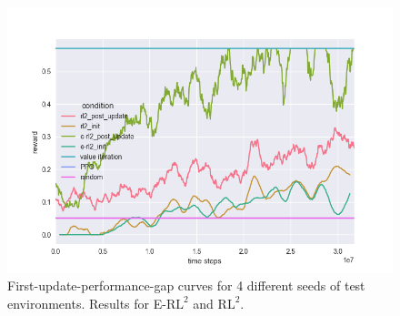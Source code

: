 \begin{figure}[H]
\begin{center}
\includegraphics[scale=0.335]{bradly_curves/gap_grids_rl2_3.png}
\end{center}
\caption{First-update-performance-gap curves for 4 different seeds of test environments. Results for E-$\text{RL}^2$ and $\text{RL}^2$.}
\label{fig:appendix-gap-curves-1}
\end{figure}